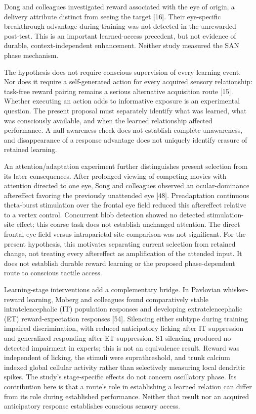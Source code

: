 \documentclass[
  american,
  11pt,
  letterpaper,
]{article}
\begin{document}
Dong and colleagues investigated reward associated with the eye of origin, a delivery attribute distinct from seeing the target {[}16{]}. Their eye-specific breakthrough advantage during training was not detected in the unrewarded post-test. This is an important learned-access precedent, but not evidence of durable, context-independent enhancement. Neither study measured the SAN phase mechanism.

The hypothesis does not require conscious supervision of every learning event. Nor does it require a self-generated action for every acquired sensory relationship: task-free reward pairing remains a serious alternative acquisition route {[}15{]}. Whether executing an action adds to informative exposure is an experimental question. The present proposal must separately identify what was learned, what was consciously available, and when the learned relationship affected performance. A null awareness check does not establish complete unawareness, and disappearance of a response advantage does not uniquely identify erasure of retained learning.

An attention/adaptation experiment further distinguishes present selection from its later consequences. After prolonged viewing of competing movies with attention directed to one eye, Song and colleagues observed an ocular-dominance aftereffect favoring the previously unattended eye {[}48{]}. Preadaptation continuous theta-burst stimulation over the frontal eye field reduced this aftereffect relative to a vertex control. Concurrent blob detection showed no detected stimulation-site effect; this coarse task does not establish unchanged attention. The direct frontal-eye-field versus intraparietal-site comparison was not significant. For the present hypothesis, this motivates separating current selection from retained change, not treating every aftereffect as amplification of the attended input. It does not establish durable reward learning or the proposed phase-dependent route to conscious tactile access.

Learning-stage interventions add a complementary bridge. In Pavlovian whisker-reward learning, Moberg and colleagues found comparatively stable intratelencephalic (IT) population responses and developing extratelencephalic (ET) reward-expectation responses {[}54{]}. Silencing either subtype during training impaired discrimination, with reduced anticipatory licking after IT suppression and generalized responding after ET suppression. S1 silencing produced no detected impairment in experts; this is not an equivalence result. Reward was independent of licking, the stimuli were suprathreshold, and trunk calcium indexed global cellular activity rather than selectively measuring local dendritic spikes. The study's stage-specific effects do not concern oscillatory phase. Its contribution here is that a route's role in establishing a learned relation can differ from its role during established performance. Neither that result nor an acquired anticipatory response establishes conscious sensory access.
\end{document}
